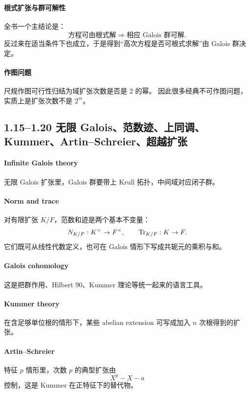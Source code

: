 \documentclass[a4paper]{ctexart}
\begin{document}
\paragraph{根式扩张与群可解性}
全书一个主结论是：
\[
\text{方程可由根式解}
\Longrightarrow
\text{相应 Galois 群可解}.
\]
反过来在适当条件下也成立，于是得到“高次方程是否可根式求解”由 Galois 群决定。

\paragraph{作图问题}
尺规作图可行性归结为域扩张次数是否是 \(2\) 的幂。
因此很多经典不可作图问题，实质上是扩张次数不是 \(2^m\)。

\subsection{1.15--1.20 无限 Galois、范数迹、上同调、Kummer、Artin--Schreier、超越扩张}

\paragraph{Infinite Galois theory}
无限 Galois 扩张里，Galois 群要带上 Krull 拓扑，中间域对应闭子群。

\paragraph{Norm and trace}
对有限扩张 \(K/F\)，范数和迹是两个基本不变量：
\[
N_{K/F}:K^\times\to F^\times,\qquad
{\rm Tr}_{K/F}:K\to F.
\]
它们既可从线性代数定义，也可在 Galois 情形下写成共轭元的乘积与和。

\paragraph{Galois cohomology}
这是把群作用、Hilbert 90、Kummer 理论等统一起来的语言工具。

\paragraph{Kummer theory}
在含足够单位根的情形下，某些 abelian extension 可写成加入 \(n\) 次根得到的扩张。

\paragraph{Artin--Schreier}
特征 \(p\) 情形里，次数 \(p\) 的典型扩张由
\[
X^p-X-a
\]
控制，这是 Kummer 在正特征下的替代物。
\end{document}
